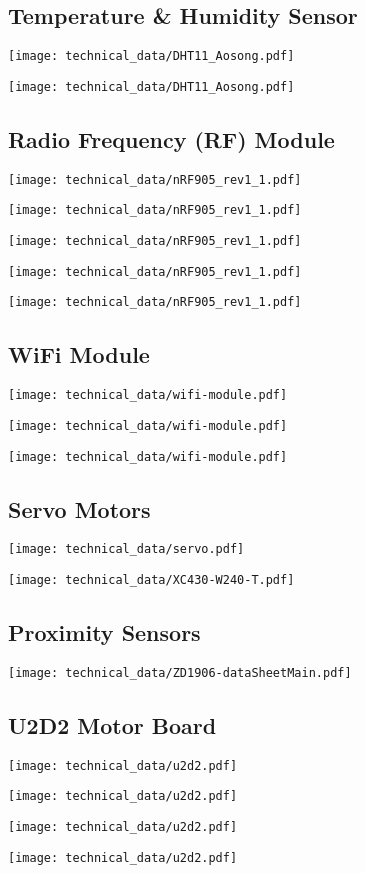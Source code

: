 \newpage\subsection{Temperature \& Humidity Sensor}
\texttt{[image: technical\_data/DHT11\_Aosong.pdf]}

\texttt{[image: technical\_data/DHT11\_Aosong.pdf]}

\newpage\subsection{Radio Frequency (RF) Module}
\texttt{[image: technical\_data/nRF905\_rev1\_1.pdf]}

\texttt{[image: technical\_data/nRF905\_rev1\_1.pdf]}

\texttt{[image: technical\_data/nRF905\_rev1\_1.pdf]}

\texttt{[image: technical\_data/nRF905\_rev1\_1.pdf]}

\texttt{[image: technical\_data/nRF905\_rev1\_1.pdf]}

\newpage\subsection{WiFi Module}
\label{app:wifi-module}
\texttt{[image: technical\_data/wifi-module.pdf]}

\texttt{[image: technical\_data/wifi-module.pdf]}

\texttt{[image: technical\_data/wifi-module.pdf]}

\newpage\subsection{Servo Motors}
\texttt{[image: technical\_data/servo.pdf]}

\texttt{[image: technical\_data/XC430-W240-T.pdf]}

\newpage\subsection{Proximity Sensors}
\texttt{[image: technical\_data/ZD1906-dataSheetMain.pdf]}

\newpage\subsection{U2D2 Motor Board}
\texttt{[image: technical\_data/u2d2.pdf]}

\texttt{[image: technical\_data/u2d2.pdf]}

\texttt{[image: technical\_data/u2d2.pdf]}

\texttt{[image: technical\_data/u2d2.pdf]}